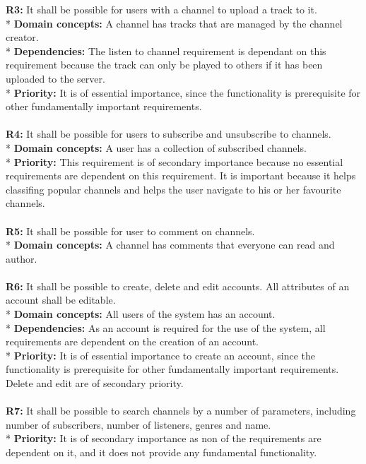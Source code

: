 \documentclass[a4paper,11pt,report]{article}
\begin{document}
\textbf{R3:}
It shall be possible for users with a channel to upload a track to it. \\*
\textbf{Domain concepts:}
A channel has tracks that are managed by the channel creator. \\*
\textbf{Dependencies:}
The listen to channel requirement is dependant on this requirement because the track can only be played to others if it has been uploaded to the server.\\*
\textbf{Priority:}
It is of essential importance, since the functionality is prerequisite for other fundamentally important requirements.
\\ \\

\textbf{R4:}
It shall be possible for users to subscribe and unsubscribe to channels. \\*
\textbf{Domain concepts:}
A user has a collection of subscribed channels. \\*
\textbf{Priority:}
This requirement is of secondary importance because no essential requirements are dependent on this requirement. It is important because it helps classifing popular channels and helps the user navigate to his or her favourite channels.
\\ \\

\textbf{R5:}
It shall be possible for user to comment on channels. \\*
\textbf{Domain concepts:}
A channel has comments that everyone can read and author.
\\ \\

\textbf{R6:}
It shall be possible to create, delete and edit accounts. All attributes of an account shall be editable. \\*
\textbf{Domain concepts:}
All users of the system has an account. \\*
\textbf{Dependencies:}
As an account is required for the use of the system, all requirements are dependent on the creation of an account. \\*
\textbf{Priority:} 
It is of essential importance to create an account, since the functionality is prerequisite for other fundamentally important requirements. Delete and edit are of secondary priority.
\\ \\

\textbf{R7:}
It shall be possible to search channels by a number of parameters, including number of subscribers, number of listeners, genres and name. \\*
\textbf{Priority:} 
It is of secondary importance as non of the requirements are dependent on it, and it does not provide any fundamental functionality.
\end{document}
